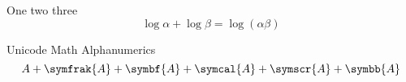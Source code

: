 \documentclass[a4paper]{article}
\begin{document}
 One two three
 \[
 \log \alpha + \log \beta = \log(\alpha\beta)
 \]
 
 Unicode Math Alphanumerics
 \[A + \symfrak{A}+\symbf{A}+ \symcal{A} + \symscr{A}+
 \symbb{A}\]
 
\end{document}
